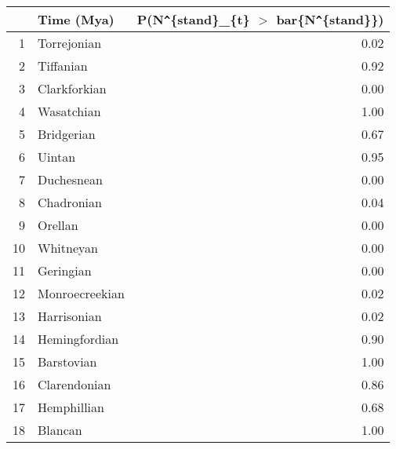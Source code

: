 \begin{table}[ht]
\centering
\begin{tabular}{rlr}
  \hline
 & Time (Mya) & P(N\verb|^|\{stand\}\_\{t\} $>$ bar\{N\verb|^|\{stand\}\}) \\ 
  \hline
1 & Torrejonian & 0.02 \\ 
  2 & Tiffanian & 0.92 \\ 
  3 & Clarkforkian & 0.00 \\ 
  4 & Wasatchian & 1.00 \\ 
  5 & Bridgerian & 0.67 \\ 
  6 & Uintan & 0.95 \\ 
  7 & Duchesnean & 0.00 \\ 
  8 & Chadronian & 0.04 \\ 
  9 & Orellan & 0.00 \\ 
  10 & Whitneyan & 0.00 \\ 
  11 & Geringian & 0.00 \\ 
  12 & Monroecreekian & 0.02 \\ 
  13 & Harrisonian & 0.02 \\ 
  14 & Hemingfordian & 0.90 \\ 
  15 & Barstovian & 1.00 \\ 
  16 & Clarendonian & 0.86 \\ 
  17 & Hemphillian & 0.68 \\ 
  18 & Blancan & 1.00 \\ 
   \hline
\end{tabular}
\label{tab:div_peak}
\end{table}

